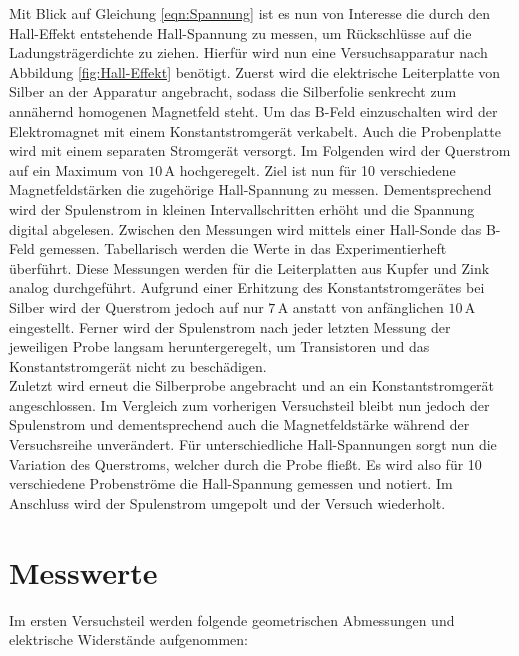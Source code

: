 \noindent Mit Blick auf Gleichung \eqref{eqn:Spannung} ist es nun von Interesse die durch den Hall-Effekt entstehende 
Hall-Spannung zu messen, um Rückschlüsse auf die Ladungsträgerdichte zu ziehen. Hierfür wird nun eine Versuchsapparatur 
nach Abbildung \ref{fig:Hall-Effekt} benötigt. Zuerst wird die elektrische Leiterplatte von Silber an der Apparatur 
angebracht, sodass die Silberfolie senkrecht zum annähernd homogenen Magnetfeld steht. Um das B-Feld einzuschalten wird 
der Elektromagnet mit einem Konstantstromgerät verkabelt. Auch die Probenplatte wird mit einem separaten Stromgerät versorgt.
Im Folgenden wird der Querstrom auf ein Maximum von $10\,\unit{\ampere}$ hochgeregelt. Ziel ist nun für 10 verschiedene 
Magnetfeldstärken die zugehörige Hall-Spannung zu messen. Dementsprechend wird der Spulenstrom in kleinen Intervallschritten 
erhöht und die Spannung digital abgelesen. Zwischen den Messungen wird mittels einer Hall-Sonde das B-Feld gemessen. Tabellarisch 
werden die Werte in das Experimentierheft überführt. Diese Messungen werden für die Leiterplatten aus Kupfer und Zink analog 
durchgeführt. Aufgrund einer Erhitzung des Konstantstromgerätes bei Silber wird der Querstrom jedoch auf nur $7\,\unit{\ampere}$
anstatt von anfänglichen $10\,\unit{\ampere}$ eingestellt. Ferner wird der Spulenstrom nach jeder letzten Messung der jeweiligen 
Probe langsam heruntergeregelt, um Transistoren und das Konstantstromgerät nicht zu beschädigen.\\

\noindent Zuletzt wird erneut die Silberprobe angebracht und an ein Konstantstromgerät angeschlossen. Im Vergleich zum vorherigen 
Versuchsteil bleibt nun jedoch der Spulenstrom und dementsprechend auch die Magnetfeldstärke während der Versuchsreihe unverändert.
Für unterschiedliche Hall-Spannungen sorgt nun die Variation des Querstroms, welcher durch die Probe fließt. Es wird also für 10 
verschiedene Probenströme die Hall-Spannung gemessen und notiert. Im Anschluss wird der Spulenstrom umgepolt und der Versuch wiederholt.\\

\noindent 

\section{Messwerte}
\label{sec:Messwerte}

Im ersten Versuchsteil werden folgende geometrischen Abmessungen und elektrische Widerstände aufgenommen:

